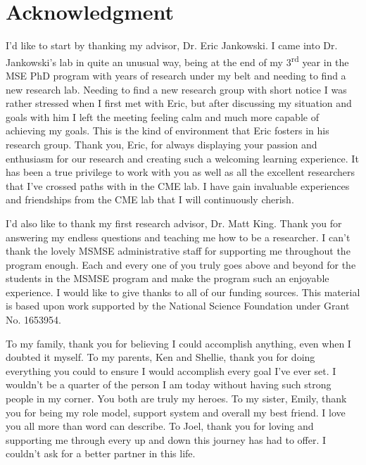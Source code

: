 \chapter*{Acknowledgment}

\par I'd like to start by thanking my advisor, Dr. Eric Jankowski. I came into Dr. Jankowski’s lab in quite an unusual way, being at the end of my 3\textsuperscript{rd} year in the MSE PhD program with years of research under my belt and needing to find a new research lab. Needing to find a new research group with short notice I was rather stressed when I first met with Eric, but after discussing my situation and goals with him I left the meeting feeling calm and much more capable of achieving my goals. This is the kind of environment that Eric fosters in his research group. Thank you, Eric, for always displaying your passion and enthusiasm for our research and creating such a welcoming learning experience. It has been a true privilege to work with you as well as all the excellent researchers that I've crossed paths with in the CME lab. I have gain invaluable experiences and friendships from the CME lab that I will continuously cherish. 
\par I'd also like to thank my first research advisor, Dr. Matt King. Thank you for answering my endless questions and teaching me how to be a researcher. I can't thank the lovely MSMSE administrative staff for supporting me throughout the program enough. Each and every one of you truly goes above and beyond for the students in the MSMSE program and make the program such an enjoyable experience. I would like to give thanks to all of our funding sources. This material is based upon work supported by the National Science Foundation under Grant No. 1653954. 
\par To my family, thank you for believing I could accomplish anything, even when I doubted it myself. To my parents, Ken and Shellie, thank you for doing everything you could to ensure I would accomplish every goal I've ever set. I wouldn't be a quarter of the person I am today without having such strong people in my corner. You both are truly my heroes. To my sister, Emily, thank you for being my role model, support system and overall my best friend. I love you all more than word can describe. To Joel, thank you for loving and supporting me through every up and down this journey has had to offer. I couldn't ask for a better partner in this life. 


